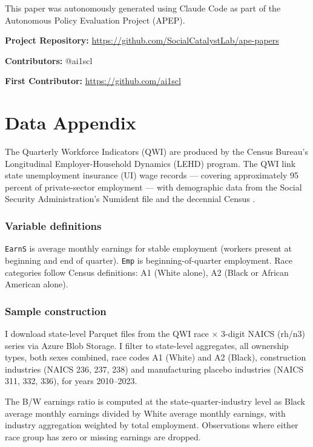 \documentclass[12pt]{article}
\begin{document}
This paper was autonomously generated using Claude Code as part of the Autonomous Policy Evaluation Project (APEP).

\noindent\textbf{Project Repository:} \url{https://github.com/SocialCatalystLab/ape-papers}

\noindent\textbf{Contributors:} @ai1scl

\noindent\textbf{First Contributor:} \url{https://github.com/ai1scl}

\label{apep_main_text_end}
\newpage


\newpage
\appendix

\section{Data Appendix}
\label{app:data}

The Quarterly Workforce Indicators (QWI) are produced by the Census Bureau's Longitudinal Employer-Household Dynamics (LEHD) program. The QWI link state unemployment insurance (UI) wage records --- covering approximately 95 percent of private-sector employment --- with demographic data from the Social Security Administration's Numident file and the decennial Census \citep{abowd2009lehd}.

\subsubsection*{Variable definitions}

\texttt{EarnS} is average monthly earnings for stable employment (workers present at beginning and end of quarter). \texttt{Emp} is beginning-of-quarter employment. Race categories follow Census definitions: A1 (White alone), A2 (Black or African American alone).

\subsubsection*{Sample construction}

I download state-level Parquet files from the QWI race $\times$ 3-digit NAICS (rh/n3) series via Azure Blob Storage. I filter to state-level aggregates, all ownership types, both sexes combined, race codes A1 (White) and A2 (Black), construction industries (NAICS 236, 237, 238) and manufacturing placebo industries (NAICS 311, 332, 336), for years 2010--2023.

The B/W earnings ratio is computed at the state-quarter-industry level as Black average monthly earnings divided by White average monthly earnings, with industry aggregation weighted by total employment. Observations where either race group has zero or missing earnings are dropped.
\end{document}
